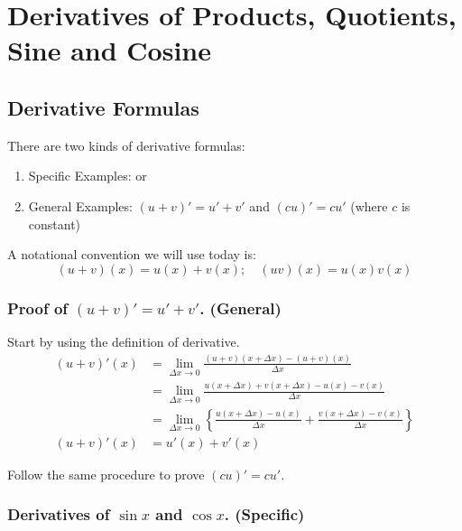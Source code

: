 

\chapter{Derivatives of Products, Quotients, Sine and Cosine}  

\bigbreak
\section{Derivative Formulas}

There are two kinds of derivative formulas:

\begin{enumerate}
\item Specific Examples:  or 
\item General Examples: $(u+v)' = u' + v'$ and $(cu)' = cu'$ (where $c$ is constant)
\end{enumerate}

A notational convention we will use today is:
$$(u+v)(x) = u(x) + v(x); \quad (uv)(x) = u(x)v(x)$$ 

\subsection{Proof of $(u+v)' = u'+v'$. (General)}

Start by using the definition of derivative.
\begin{align*}
	(u+v)'(x)	& = \lim_{\Delta x \to 0} \frac{(u+v)(x+\Delta x) - (u+v)(x)}{\Delta x} \\
				& = \lim_{\Delta x \to 0} \frac{u(x+\Delta x)+v(x+\Delta x) - u(x) - v(x)}{\Delta x} \\
				& = \lim_{\Delta x \to 0} \left\{ \frac{u(x+\Delta x) - u(x)}{\Delta x} + \frac{v(x+\Delta x) - v(x)}{\Delta x} \right\} \\
	(u+v)'(x)	& = u'(x) + v'(x)
\end{align*}

Follow the same procedure to prove $(cu)' = cu'$.

\subsection{Derivatives of $\sin x$ and $\cos x$. (Specific)}

